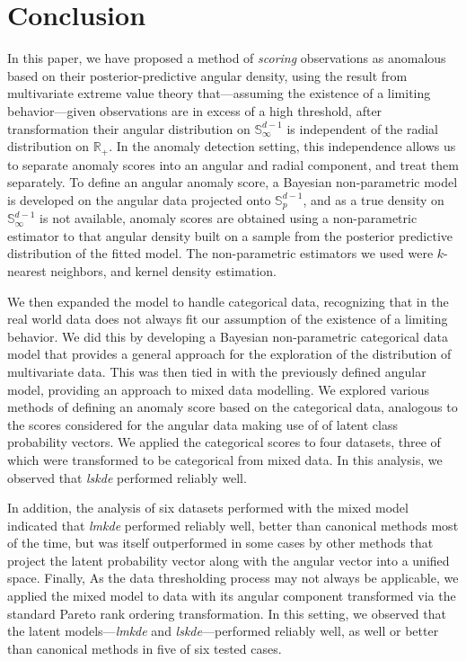 \section{Conclusion\label{sec:conclusion}}
In this paper, we have proposed a method of \emph{scoring} observations as 
    anomalous based on their posterior-predictive angular density, using the 
    result from multivariate extreme value theory that---assuming the existence 
    of a limiting behavior---given observations are in excess of a high 
    threshold, after transformation their angular distribution on 
    $\mathbb{S}_{\infty}^{d-1}$ is independent of the radial distribution on 
    $\mathbb{R}_+$.  In the anomaly detection setting, this independence allows
    us to separate anomaly scores into an angular and radial component, and
    treat them separately.  To define an angular anomaly score, a Bayesian 
    non-parametric model is developed on the angular data projected onto 
    $\mathbb{S}_p^{d-1}$, and as a true density on $\mathbb{S}_{\infty}^{d-1}$ 
    is not available, anomaly scores are obtained using a non-parametric 
    estimator to that angular density built on a sample from the posterior 
    predictive distribution of the fitted model.  The non-parametric estimators 
    we used were $k$-nearest neighbors, and kernel density estimation.

We then expanded the model to handle categorical data, recognizing that in the 
    real world data does not always fit our assumption of the existence of a 
    limiting behavior.  We did this by developing a Bayesian non-parametric 
    categorical data model that provides a general approach for the exploration
    of the distribution of multivariate data. This was then tied in with the
    previously defined angular model, providing an approach to mixed data 
    modelling.  We explored various methods of defining an anomaly score based 
    on the categorical data, analogous to the scores considered for the angular 
    data making use of of latent class probability vectors. We applied the 
    categorical scores to four datasets, three of which were transformed to be 
    categorical from mixed data.  In this analysis, we observed that 
    \emph{lskde} performed reliably well.

In addition, the analysis of six datasets performed with the mixed model
    indicated that \emph{lmkde} performed reliably well, better than canonical 
    methods most of the time, but was itself outperformed in some cases by other 
    methods that project the latent probability vector along with the angular 
    vector into a unified space.  Finally, As the data thresholding process 
    may not always be applicable, we applied the mixed model to data with its 
    angular component transformed via the standard Pareto rank ordering 
    transformation. In this setting, we observed that the latent 
    models---\emph{lmkde} and \emph{lskde}---performed reliably well, as well 
    or better than canonical methods in five of six tested cases.


